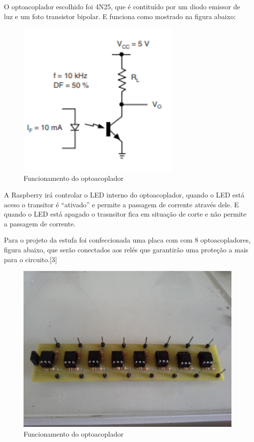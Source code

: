 O optoacoplador escolhido foi 4N25, que é contituído por um diodo emissor de luz e um foto transistor bipolar. E funciona como mostrado na figura abaixo:

\begin{figure}[H]
	\centering
	\includegraphics[width=8cm]{figuras/optocoaplador.png}
	\caption{Funcionamento do optoacoplador} \label{optocoaplador}
\end{figure}

A Raspberry irá controlar o LED interno do optoacoplador, quando o LED está aceso o transitor é “ativado” e permite a passagem de corrente através dele. E quando o LED está apagado o trasnsitor fica em situação de corte e não permite a passagem de corrente.

Para o projeto da estufa foi confeccionada uma placa com com 8 optoacopladores, figura abaixo, que serão conectados aos relés que garantirão uma proteção a mais para o circuito\cite{vishay}.[3]

\begin{figure}[H]
	\centering
	\includegraphics[width=15cm]{figuras/optoacopladores.jpg}
	\caption{Funcionamento do optoacoplador} \label{optoacopladores}
\end{figure}

